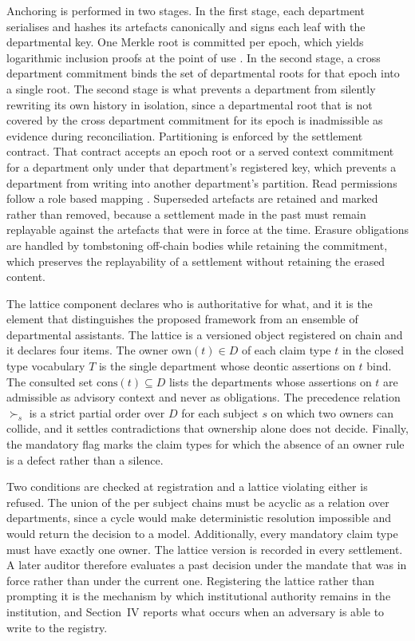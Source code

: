 \documentclass[journal]{IEEEtran}
\begin{document}
Anchoring is performed in two stages. In the first stage, each department serialises and hashes its artefacts canonically and signs each leaf with the departmental key. One Merkle root is committed per epoch, which yields logarithmic inclusion proofs at the point of use \cite{merkle1988signature}. In the second stage, a cross department commitment binds the set of departmental roots for that epoch into a single root. The second stage is what prevents a department from silently rewriting its own history in isolation, since a departmental root that is not covered by the cross department commitment for its epoch is inadmissible as evidence during reconciliation. Partitioning is enforced by the settlement contract. That contract accepts an epoch root or a served context commitment for a department only under that department's registered key, which prevents a department from writing into another department's partition. Read permissions follow a role based mapping \cite{sandhu1996rbac}. Superseded artefacts are retained and marked rather than removed, because a settlement made in the past must remain replayable against the artefacts that were in force at the time. Erasure obligations are handled by tombstoning off-chain bodies while retaining the commitment, which preserves the replayability of a settlement without retaining the erased content.

The lattice component declares who is authoritative for what, and it is the element that distinguishes the proposed framework from an ensemble of departmental assistants. The lattice is a versioned object registered on chain and it declares four items. The owner $\mathrm{own}(t)\in D$ of each claim type $t$ in the closed type vocabulary $T$ is the single department whose deontic assertions on $t$ bind. The consulted set $\mathrm{cons}(t)\subseteq D$ lists the departments whose assertions on $t$ are admissible as advisory context and never as obligations. The precedence relation $\succ_s$ is a strict partial order over $D$ for each subject $s$ on which two owners can collide, and it settles contradictions that ownership alone does not decide. Finally, the mandatory flag marks the claim types for which the absence of an owner rule is a defect rather than a silence.

Two conditions are checked at registration and a lattice violating either is refused. The union of the per subject chains must be acyclic as a relation over departments, since a cycle would make deterministic resolution impossible and would return the decision to a model. Additionally, every mandatory claim type must have exactly one owner. The lattice version is recorded in every settlement. A later auditor therefore evaluates a past decision under the mandate that was in force rather than under the current one. Registering the lattice rather than prompting it is the mechanism by which institutional authority remains in the institution, and Section~IV reports what occurs when an adversary is able to write to the registry.
\end{document}
